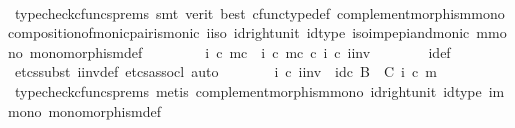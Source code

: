 \begin{isabellebody}
\ \ \ \ \ \ \isamarkupfalse%
\ {\isacharparenleft}{\kern0pt}typecheck{\isacharunderscore}{\kern0pt}cfuncs{\isacharunderscore}{\kern0pt}prems{\isacharcomma}{\kern0pt}\ smt\ {\isacharparenleft}{\kern0pt}verit{\isacharcomma}{\kern0pt}\ best{\isacharparenright}{\kern0pt}\ cfunc{\isacharunderscore}{\kern0pt}type{\isacharunderscore}{\kern0pt}def\ complement{\isacharunderscore}{\kern0pt}morphism{\isacharunderscore}{\kern0pt}mono\ composition{\isacharunderscore}{\kern0pt}of{\isacharunderscore}{\kern0pt}monic{\isacharunderscore}{\kern0pt}pair{\isacharunderscore}{\kern0pt}is{\isacharunderscore}{\kern0pt}monic\ i{\isacharunderscore}{\kern0pt}iso\ id{\isacharunderscore}{\kern0pt}right{\isacharunderscore}{\kern0pt}unit{}\ id{\isacharunderscore}{\kern0pt}type\ iso{\isacharunderscore}{\kern0pt}imp{\isacharunderscore}{\kern0pt}epi{\isacharunderscore}{\kern0pt}and{\isacharunderscore}{\kern0pt}monic\ m{\isacharunderscore}{\kern0pt}mono\ monomorphism{\isacharunderscore}{\kern0pt}def{}{\isacharparenright}{\kern0pt}\isanewline
\ \ \isamarkupfalse%
\isanewline
\ \ \ \ \isamarkupfalse%
\ {\isachardoublequoteopen}{\isacharparenleft}{\kern0pt}i\ {\isasymcirc}\isactrlsub c\ m{\isacharparenright}{\kern0pt}\isactrlsup c\ {\isacharequal}{\kern0pt}\ {\isacharparenleft}{\kern0pt}i\ {\isasymcirc}\isactrlsub c\ m{\isacharparenright}{\kern0pt}\isactrlsup c\ {\isasymcirc}\isactrlsub c\ i{\isacharprime}{\kern0pt}\ {\isasymcirc}\isactrlsub c\ i{\isacharprime}{\kern0pt}{\isacharunderscore}{\kern0pt}inv{\isachardoublequoteclose}\isanewline
\ \ \ \ \ \ \isamarkupfalse%
\ i{\isacharprime}{\kern0pt}{\isacharunderscore}{\kern0pt}def\ \isamarkupfalse%
\ {\isacharparenleft}{\kern0pt}etcs{\isacharunderscore}{\kern0pt}subst\ i{\isacharprime}{\kern0pt}{\isacharunderscore}{\kern0pt}inv{\isacharunderscore}{\kern0pt}def{\isacharcomma}{\kern0pt}\ etcs{\isacharunderscore}{\kern0pt}assocl{\isacharcomma}{\kern0pt}\ auto{\isacharparenright}{\kern0pt}\isanewline
\ \ \ \ \isamarkupfalse%
\ \isamarkupfalse%
\ {\isachardoublequoteopen}i{\isacharprime}{\kern0pt}\ {\isasymcirc}\isactrlsub c\ i{\isacharprime}{\kern0pt}{\isacharunderscore}{\kern0pt}inv\ {\isacharequal}{\kern0pt}\ id\isactrlsub c\ {\isacharparenleft}{\kern0pt}B\ {\isasymsetminus}\ {\isacharparenleft}{\kern0pt}C{\isacharcomma}{\kern0pt}\ i\ {\isasymcirc}\isactrlsub c\ m{\isacharparenright}{\kern0pt}{\isacharparenright}{\kern0pt}{\isachardoublequoteclose}\isanewline
\ \ \ \ \ \ \isamarkupfalse%
\ {\isacharparenleft}{\kern0pt}typecheck{\isacharunderscore}{\kern0pt}cfuncs{\isacharunderscore}{\kern0pt}prems{\isacharcomma}{\kern0pt}\ metis\ complement{\isacharunderscore}{\kern0pt}morphism{\isacharunderscore}{\kern0pt}mono\ id{\isacharunderscore}{\kern0pt}right{\isacharunderscore}{\kern0pt}unit{}\ id{\isacharunderscore}{\kern0pt}type\ im{\isacharunderscore}{\kern0pt}mono\ monomorphism{\isacharunderscore}{\kern0pt}def{}{\isacharparenright}{\kern0pt}\isanewline

\end{isabellebody}
